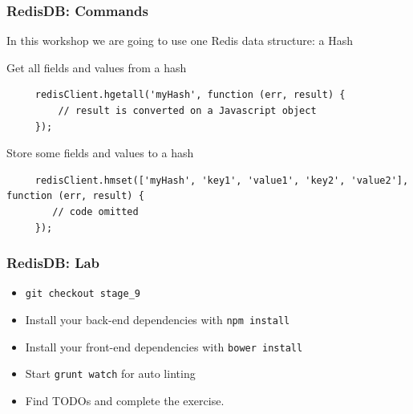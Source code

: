 \begin{frame}[fragile]
  \frametitle{RedisDB: Commands}
   In this workshop we are going to use one Redis data structure: a Hash

   \pause

   \begin{block}{Get all fields and values from a hash}
     {\tiny
     \begin{verbatim}
     redisClient.hgetall('myHash', function (err, result) {
         // result is converted on a Javascript object
     });
     \end{verbatim}
     }
   \end{block}

   \begin{block}{Store some fields and values to a hash}
     {\tiny
     \begin{verbatim}
     redisClient.hmset(['myHash', 'key1', 'value1', 'key2', 'value2'], function (err, result) {
        // code omitted
     });
     \end{verbatim}
     }
   \end{block}
\end{frame}

\begin{frame}[fragile]
  \frametitle{RedisDB: Lab}

  \begin{itemize}
    \item \texttt{git checkout stage\_9}
    \item Install your back-end dependencies with \texttt{npm install}
    \item Install your front-end dependencies with \texttt{bower install}
    \item Start \texttt{grunt watch} for auto linting
    \item Find TODOs and complete the exercise.
  \end{itemize}
\end{frame}

